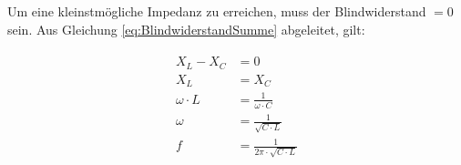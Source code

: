 Um eine kleinstmögliche Impedanz zu erreichen, muss der Blindwiderstand $=0$ sein. Aus Gleichung \ref{eq:BlindwiderstandSumme} abgeleitet, gilt:

\begin{align}	\label{eq:Resonanzfrequenz}
\begin{split}
	X_L - X_C &= 0 \\
	X_L &= X_C \\
	\omega \cdot L &= \frac{1}{\omega \cdot C} \\
	\omega &= \frac{1}{\sqrt{C \cdot L}} \\	
	f &= \frac{1}{2 \pi \cdot \sqrt{C \cdot L}} \\
\end{split}
\end{align}